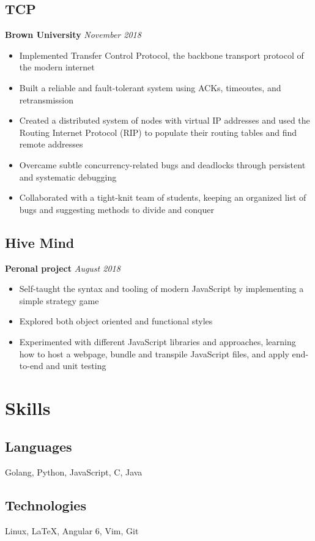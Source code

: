\documentclass[11pt]{article}
\begin{document}
\subsection{TCP}
\textbf{Brown University} \hfill \textit{November 2018}
\begin{itemize}
	\item Implemented Transfer Control Protocol, the backbone transport protocol of the modern internet 
	\item Built a reliable and fault-tolerant system using ACKs, timeoutes, and retransmission
	\item Created a distributed system of nodes with virtual IP addresses and used the Routing Internet Protocol (RIP) to populate their routing tables and find remote addresses
	\item Overcame subtle concurrency-related bugs and deadlocks through persistent and systematic debugging 
	\item Collaborated with a tight-knit team of students, keeping an organized list of bugs and suggesting methods to divide and conquer
\end{itemize}

\subsection{Hive Mind} 
\textbf{Peronal project} \hfill \textit{August 2018}
\begin{itemize}
	\item Self-taught the syntax and tooling of modern JavaScript by implementing a simple strategy game 
	\item Explored both object oriented and functional styles 
	\item Experimented with different JavaScript libraries and approaches, learning how to host a webpage, bundle and transpile JavaScript files, and apply end-to-end and unit testing 
\end{itemize}




\section{Skills}
\begin{minipage}{20em}
	\subsection{Languages}
		Golang, Python, JavaScript, C, Java
\end{minipage}
\begin{minipage}{25em}
	\subsection{Technologies}
	Linux, \LaTeX , Angular 6, Vim, Git 	
\end{minipage}
\end{document}
